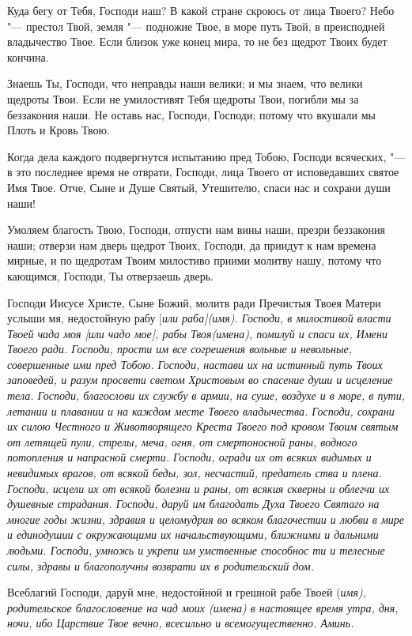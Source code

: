 Куда бегу от Тебя, Господи наш? В какой стране скроюсь от лица Твоего? Небо "--- престол Твой, земля "--- подножие Твое, в море путь Твой, в преисподней владычество Твое. Если близок уже конец мира, то не без щедрот Твоих будет кончина. 

Знаешь Ты, Господи, что неправды наши велики; и мы знаем, что велики щедроты Твои. Если не умилостивят Тебя щедроты Твои, погибли мы за беззакония наши. Не оставь нас, Господи, Господи; потому что вкушали мы Плоть и Кровь Твою. 

Когда дела каждого подвергнутся испытанию пред Тобою, Господи всяческих, "--- в это последнее время не отврати, Господи, лица Твоего от исповедавших святое Имя Твое. Отче, Сыне и Душе Святый, Утешителю, спаси нас и сохрани души наши! 

Умоляем благость Твою, Господи, отпусти нам вины наши, презри беззакония наши; отверзи нам дверь щедрот Твоих, Господи, да приидут к нам времена мирные, и по щедротам Твоим милостиво приими молитву нашу, потому что кающимся, Господи, Ты отверзаешь дверь.
\mychapterending

 


Господи Иисусе Христе, Сыне Божий, молитв ради Пречистыя Твоея Матери услыши мя, недостойную рабу [\itshape или\normalfont{} раба]\itshape  (имя).\normalfont{} Господи, в милостивой власти Твоей чада моя [\itshape или\normalfont{} чадо мое], рабы Твоя\itshape  (имена),\normalfont{} помилуй и спаси их, Имени Твоего ради. Господи, прости им все согрешения вольные и невольные, совершенные ими пред Тобою. Господи, настави их на истинный путь Твоих заповедей, и разум просвети светом Христовым во спасение души и исцеление тела. Господи, благослови их службу в армии, на суше, воздухе и в море, в пути, летании и плавании и на каждом месте Твоего владычества. Господи, сохрани их силою Честного и Животворящего Креста Твоего под кровом Твоим святым от летящей пули, стрелы, меча, огня, от смертоносной раны, водного потопления и напрасной смерти. Господи, огради их от всяких видимых и невидимых врагов, от всякой беды, зол, несчастий, предатель ства и плена. Господи, исцели их от всякой болезни и раны, от всякия скверны и облегчи их душевные страдания. Господи, даруй им благодать Духа Твоего Святаго на многие годы жизни, здравия и целомудрия во всяком благочестии и любви в мире и единодушии с окружающими их начальствующими, ближними и дальними людьми. Господи, умножь и укрепи им умственные способнос ти и телесные силы, здравы и благополучны возврати их в родительский дом. 

Всеблагий  Господи, даруй мне, недостойной и грешной рабе Твоей (\itshape имя\normalfont{}), родительское благословение на чад моих (\itshape имена\normalfont{}) в настоящее время утра, дня, ночи, ибо Царствие Твое вечно, всесильно и всемогущественно. Аминь. 



\mychapterending

